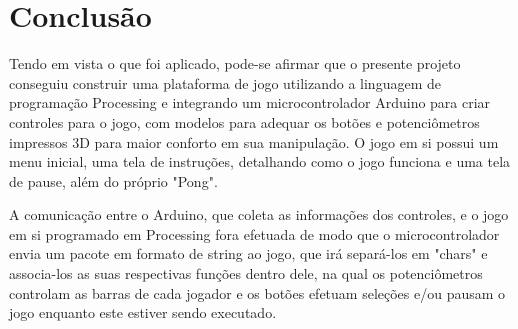 \section{Conclusão}

	Tendo em vista o que foi aplicado, pode-se afirmar que o presente projeto conseguiu construir uma plataforma de jogo utilizando a linguagem de programação Processing e integrando um microcontrolador Arduino para criar controles para o jogo, com modelos para adequar os botões e potenciômetros impressos 3D para maior conforto em sua manipulação. O jogo em si possui um menu inicial, uma tela de instruções, detalhando como o jogo funciona e uma tela de pause, além do próprio "Pong".
	
	A comunicação entre o Arduino, que coleta as informações dos controles, e o jogo em si programado em Processing fora efetuada de modo que o microcontrolador envia um pacote em formato de string ao jogo, que irá separá-los em "chars" e associa-los as suas respectivas funções dentro dele, na qual os potenciômetros controlam as barras de cada jogador e os botões efetuam seleções e/ou pausam o jogo enquanto este estiver sendo executado.